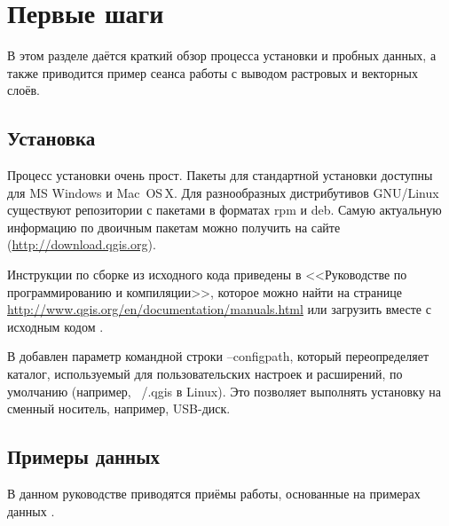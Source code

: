 
\chapter{Первые шаги}\label{label_getstarted}


В этом разделе даётся краткий обзор процесса установки \qg и пробных
данных, а также приводится пример сеанса работы с выводом растровых и векторных
слоёв.

\section{Установка}\label{label_installation}

Процесс установки \qg очень прост. Пакеты для стандартной установки
доступны для MS Windows и Mac~OS\,X. Для разнообразных дистрибутивов
GNU/Linux существуют репозитории с пакетами в форматах rpm и deb. Самую
актуальную информацию по двоичным пакетам можно получить на сайте
\qg (\url{http://download.qgis.org}).


Инструкции по сборке \qg из исходного кода приведены в <<Руководстве
по программированию и компиляции>>, которое можно найти на странице
\url{http://www.qgis.org/en/documentation/manuals.html} или загрузить вместе
с исходным кодом \qg.


В \qg добавлен параметр командной строки --configpath, который переопределяет
каталог, используемый для пользовательских настроек и расширений, по умолчанию
(например, ~/.qgis в Linux). Это позволяет выполнять установку \qg на сменный
носитель, например, USB-диск.

\section{Примеры данных}\label{label_sampledata}

В данном руководстве приводятся приёмы работы, основанные на примерах данных
\qg.

